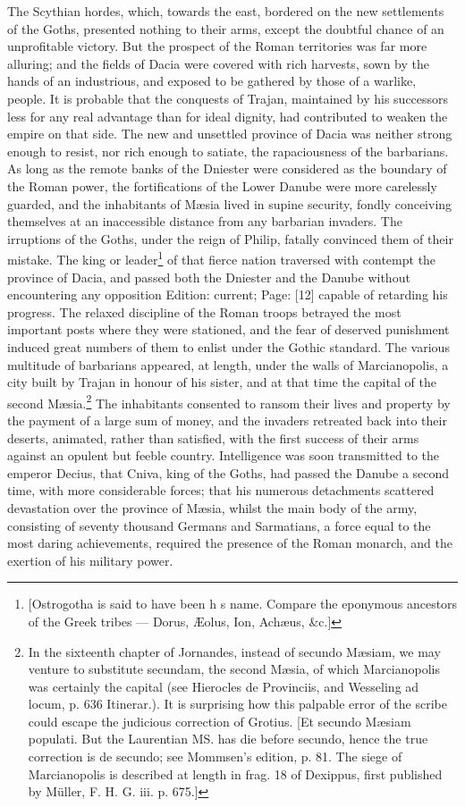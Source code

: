 The Scythian hordes, which, towards the east, bordered on the new settlements of the Goths, presented nothing to their arms, except the doubtful chance of an unprofitable victory. But the prospect of the Roman territories was far more alluring; and the fields of Dacia were covered with rich harvests, sown by the hands of an industrious, and exposed to be gathered by those of a warlike, people. It is probable that the conquests of Trajan, maintained by his successors less for any real advantage than for ideal dignity, had contributed to weaken the empire on that side. The new and unsettled province of Dacia was neither strong enough to resist, nor rich enough to satiate, the rapaciousness of the barbarians. As long as the remote banks of the Dniester were considered as the boundary of the Roman power, the fortifications of the Lower Danube were more carelessly guarded, and the inhabitants of Mæsia lived in supine security, fondly conceiving themselves at an inaccessible distance from any barbarian invaders. The irruptions of the Goths, under the reign of Philip, fatally convinced them of their mistake. The king or leader\footnote{[Ostrogotha is said to have been h s name. Compare the eponymous ancestors of the Greek tribes \texthebrew{—} Dorus, Æolus, Ion, Achæus, \&c.]} of that fierce nation traversed with contempt the province of Dacia, and passed both the Dniester and the Danube without encountering any opposition Edition: current; Page: [12] capable of retarding his progress. The relaxed discipline of the Roman troops betrayed the most important posts where they were stationed, and the fear of deserved punishment induced great numbers of them to enlist under the Gothic standard. The various multitude of barbarians appeared, at length, under the walls of Marcianopolis, a city built by Trajan in honour of his sister, and at that time the capital of the second Mæsia.\footnote{In the sixteenth chapter of Jornandes, instead of secundo Mæsiam, we may venture to substitute secundam, the second Mæsia, of which Marcianopolis was certainly the capital (see Hierocles de Provinciis, and Wesseling ad locum, p. 636 Itinerar.). It is surprising how this palpable error of the scribe could escape the judicious correction of Grotius. [Et secundo Mæsiam populati. But the Laurentian MS. has die before secundo, hence the true correction is de secundo; see Mommsen\texthebrew{}’s edition, p. 81. The siege of Marcianopolis is described at length in frag. 18 of Dexippus, first published by Müller, F. H. G. iii. p. 675.]} The inhabitants consented to ransom their lives and property by the payment of a large sum of money, and the invaders retreated back into their deserts, animated, rather than satisfied, with the first success of their arms against an opulent but feeble country. Intelligence was soon transmitted to the emperor Decius, that Cniva, king of the Goths, had passed the Danube a second time, with more considerable forces; that his numerous detachments scattered devastation over the province of Mæsia, whilst the main body of the army, consisting of seventy thousand Germans and Sarmatians, a force equal to the most daring achievements, required the presence of the Roman monarch, and the exertion of his military power.

